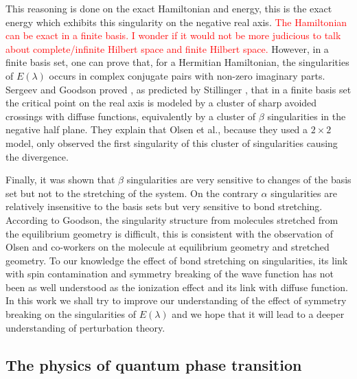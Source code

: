 \documentclass[11pt,a4paper]{article}
\newcommand{\titou}[1]{\textcolor{red}{#1}}
\begin{document}
This reasoning is done on the exact Hamiltonian and energy, this is the exact energy which exhibits this singularity on the negative real axis. 
\titou{The Hamiltonian can be exact in a finite basis. I wonder if it would not be more judicious to talk about complete/infinite Hilbert space and finite Hilbert space.}
However, in a finite basis set, one can prove that, for a Hermitian Hamiltonian, the singularities of $E(\lambda)$ occurs in complex conjugate pairs with non-zero imaginary parts. Sergeev and Goodson proved \cite{Sergeev_2005}, as predicted by Stillinger \cite{Stillinger_2000}, that in a finite basis set the critical point on the real axis is modeled by a cluster of sharp avoided crossings with diffuse functions, equivalently by a cluster of $\beta$ singularities in the negative half plane. They explain that Olsen et al., because they used a $2\times2$ model, only observed the first singularity of this cluster of singularities causing the divergence.

Finally, it was shown that $\beta$ singularities are very sensitive to changes of the basis set but not to the stretching of the system. On the contrary $\alpha$ singularities are relatively insensitive to the basis sets but very sensitive to bond stretching. According to Goodson, \cite{Goodson_2004} the singularity structure from molecules stretched from the equilibrium geometry is difficult, this is consistent with the observation of Olsen and co-workers  \cite{Olsen_2000} on the  molecule at equilibrium geometry and stretched geometry. To our knowledge the effect of bond stretching on singularities, its link with spin contamination and symmetry breaking of the wave function has not been as well understood as the ionization effect and its link with diffuse function. In this work we shall try to improve our understanding of the effect of symmetry breaking on the singularities of $E(\lambda)$ and we hope that it will lead to a deeper understanding of perturbation theory.

\subsection{The physics of quantum phase transition}
\end{document}
